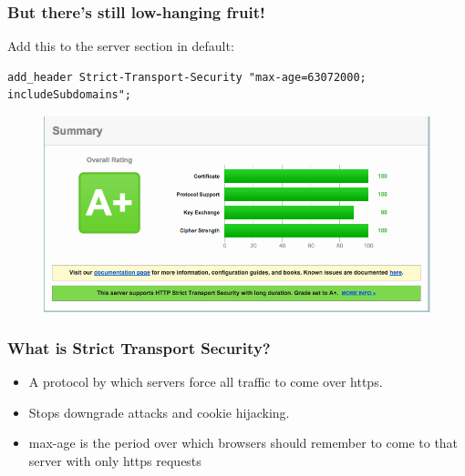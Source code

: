 \documentclass[9pt]{beamer}
\begin{document}
\begin{frame}[fragile]
\frametitle{But there's still low-hanging fruit!}
Add this to the server section in default:
\begin{verbatim}
add_header Strict-Transport-Security "max-age=63072000; includeSubdomains";
\end{verbatim}
\begin{figure}
\includegraphics[scale=0.25]{figures/SSLLabsAp.png}
\end{figure}
\end{frame}

\begin{frame}[fragile]
\frametitle{What is Strict Transport Security?}
\begin{itemize}
\item A protocol by which servers force all traffic to come over https.
\item Stops downgrade attacks and cookie hijacking.
\item max-age is the period over which browsers should remember to come to that server with only https requests
\end{itemize}
\end{frame}
\end{document}
